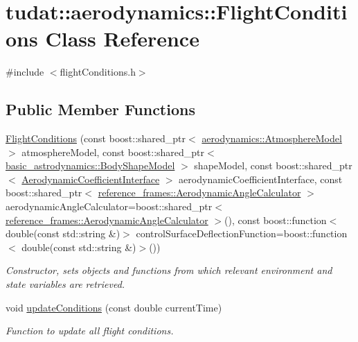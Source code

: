 \hypertarget{classtudat_1_1aerodynamics_1_1FlightConditions}{}\section{tudat\+:\+:aerodynamics\+:\+:Flight\+Conditions Class Reference}
\label{classtudat_1_1aerodynamics_1_1FlightConditions}


{\ttfamily \#include $<$flight\+Conditions.\+h$>$}

\subsection*{Public Member Functions}
\begin{DoxyCompactItemize}
\item 
\hyperlink{classtudat_1_1aerodynamics_1_1FlightConditions_ad2ec928073866cc7bbe5940a92d78e17}{Flight\+Conditions} (const boost\+::shared\+\_\+ptr$<$ \hyperlink{classtudat_1_1aerodynamics_1_1AtmosphereModel}{aerodynamics\+::\+Atmosphere\+Model} $>$ atmosphere\+Model, const boost\+::shared\+\_\+ptr$<$ \hyperlink{classtudat_1_1basic__astrodynamics_1_1BodyShapeModel}{basic\+\_\+astrodynamics\+::\+Body\+Shape\+Model} $>$ shape\+Model, const boost\+::shared\+\_\+ptr$<$ \hyperlink{classtudat_1_1aerodynamics_1_1AerodynamicCoefficientInterface}{Aerodynamic\+Coefficient\+Interface} $>$ aerodynamic\+Coefficient\+Interface, const boost\+::shared\+\_\+ptr$<$ \hyperlink{classtudat_1_1reference__frames_1_1AerodynamicAngleCalculator}{reference\+\_\+frames\+::\+Aerodynamic\+Angle\+Calculator} $>$ aerodynamic\+Angle\+Calculator=boost\+::shared\+\_\+ptr$<$ \hyperlink{classtudat_1_1reference__frames_1_1AerodynamicAngleCalculator}{reference\+\_\+frames\+::\+Aerodynamic\+Angle\+Calculator} $>$(), const boost\+::function$<$ double(const std\+::string \&)$>$ control\+Surface\+Deflection\+Function=boost\+::function$<$ double(const std\+::string \&)$>$())
\begin{DoxyCompactList}\small\item\em Constructor, sets objects and functions from which relevant environment and state variables are retrieved. \end{DoxyCompactList}\item 
void \hyperlink{classtudat_1_1aerodynamics_1_1FlightConditions_aadc4e2d6d38dc4b57f944c73b18060c7}{update\+Conditions} (const double current\+Time)
\begin{DoxyCompactList}\small\item\em Function to update all flight conditions. \end{DoxyCompactList}\item 

\end{DoxyCompactItemize}
